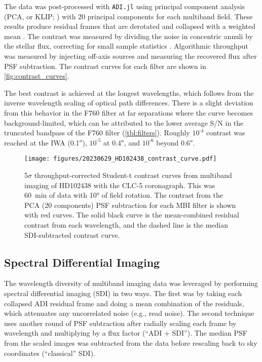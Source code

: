 The data was post-processed with \texttt{ADI.jl} \citep{lucas_adijl_2020} using principal component analysis (PCA, or KLIP; \citealt{soummer_detection_2012}) with 20 principal components for each multiband field. These results produce residual frames that are derotated and collapsed with a weighted mean \citep{bottom_noise-weighted_2017}. The contrast was measured by dividing the noise in concentric annuli by the stellar flux, correcting for small sample statistics \citep{mawet_fundamental_2014}. Algorithmic throughput was measured by injecting off-axis sources and measuring the recovered flux after PSF subtraction. The contrast curves for each filter are shown in \autoref{fig:contrast_curves}.

The best contrast is achieved at the longest wavelengths, which follows from the inverse wavelength scaling of optical path differences. There is a slight deviation from this behavior in the F760 filter at far separations where the curve becomes background-limited, which can be attributed to the lower average S/N in the truncated bandpass of the F760 filter (\autoref{tbl:filters}). Roughly $10^{\text{-}4}$ contrast was reached at the IWA (\ang{;;0.1}), $10^{\text{-}5}$ at \ang{;;0.4}, and $10^{\text{-}6}$ beyond \ang{;;0.6}.


\begin{figure}
    \centering
    \texttt{[image: figures/20230629\_HD102438\_contrast\_curve.pdf]}
    \caption{5$\sigma$ throughput-corrected Student-t contrast curves from multiband imaging of HD102438 with the CLC-5 coronagraph. This was \SI{60}{\minute} of data with \ang{10} of field rotation. The contrast from the PCA (20 components) PSF subtraction for each MBI filter is shown with red curves. The solid black curve is the mean-combined residual contrast from each wavelength, and the dashed line is the median SDI-subtracted contrast curve. \label{fig:contrast_curves}}
\end{figure}


\subsection{Spectral Differential Imaging}\label{sec:sdi}

The wavelength diversity of multiband imaging data was leveraged by performing spectral differential imaging (SDI) in two ways. The first was by taking each collapsed ADI residual frame and doing a mean combination of the residuals, which attenuates any uncorrelated noise (e.g., read noise). The second technique uses another round of PSF subtraction after radially scaling each frame by wavelength and multiplying by a flux factor (``ADI + SDI''). The median PSF from the scaled images was subtracted from the data before rescaling back to sky coordinates (``classical'' SDI).

